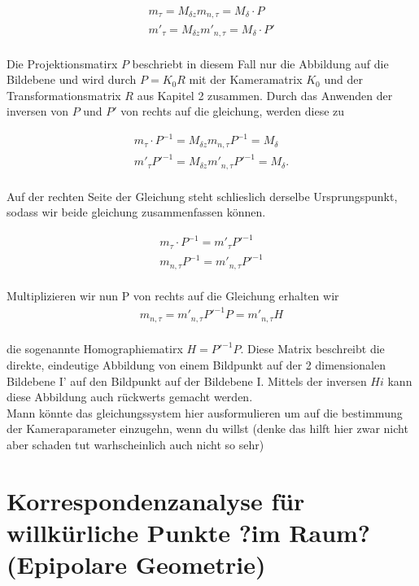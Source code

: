  
 \begin{gather}
 	m_{\tau}=M_{\delta z}m_{n,\tau} = M_{\delta} \cdot P \\
 	m'_{\tau}=M_{\delta z}m'_{n,\tau} = M_{\delta} \cdot P'
 \end{gather}\\
 
 Die Projektionsmatirx $P$ beschriebt in diesem Fall nur die Abbildung auf die Bildebene und wird durch $P=K_0R$ mit der Kameramatrix $K_0$ und der Transformationsmatrix $R$ aus Kapitel 2 zusammen. Durch das Anwenden der inversen von $P$ und $P'$ von rechts auf die gleichung, werden diese zu
 
 
 \begin{gather}
 	m_{\tau}\cdot P^{-1}=M_{\delta z}m_{n,\tau}P^{-1} = M_{\delta} \\
 	m'_{\tau}P'^{-1}=M_{\delta z}m'_{n,\tau}P'^{-1} = M_{\delta}.
 \end{gather}\\
 
 Auf der rechten Seite der Gleichung steht schlieslich derselbe Ursprungspunkt, sodass wir beide gleichung zusammenfassen können. 
 
 \begin{gather}
 	m_{\tau}\cdot P^{-1} = m'_{\tau}P'^{-1} \\
 	m_{n,\tau}P^{-1}=m'_{n,\tau}P'^{-1}
 \end{gather}\\
 
 Multiplizieren wir nun P von rechts auf die Gleichung erhalten wir 
 \begin{gather}
 	m_{n,\tau}=m'_{n,\tau}P'^{-1}P=m'_{n,\tau}H
 \end{gather}\\
 
die sogenannte Homographiematirx $H=P'^{-1}P$. Diese Matrix beschreibt die direkte, eindeutige Abbildung von einem Bildpunkt auf der 2 dimensionalen Bildebene I' auf den Bildpunkt auf der Bildebene I. Mittels der inversen $Hi$ kann diese Abbildung auch rückwerts gemacht werden. 
 \\
 Mann könnte das gleichungssystem hier ausformulieren um auf die bestimmung der Kameraparameter einzugehn, wenn du willst (denke das hilft hier zwar nicht aber schaden tut warhscheinlich auch nicht so sehr)
 
 
 
 \section{Korrespondenzanalyse für willkürliche Punkte ?im Raum? (Epipolare Geometrie)}
 
